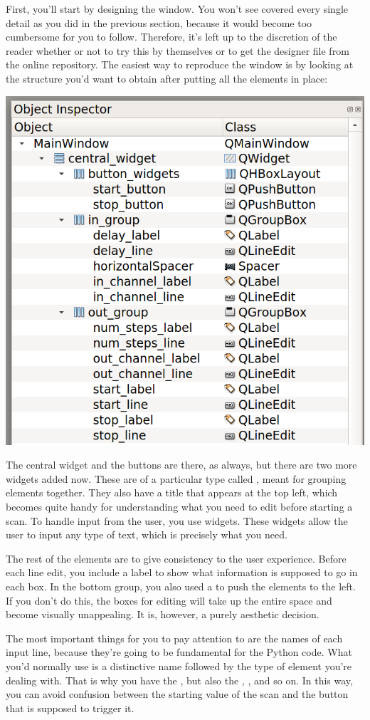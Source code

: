 First, you'll start by designing the window. You won't see covered every single detail as you did in the previous section, because it would become too cumbersome for you to follow. Therefore, it's left up to the discretion of the reader whether or not to try this by themselves or to get the designer file from the online repository. The easiest way to reproduce the window is by looking at the structure you'd want to obtain after putting all the elements in place:

\begin{center}
    \includegraphics[width=.5\textwidth]{images/Chapter_09/09_final_window_structure.png}
\end{center}

The central widget and the buttons are there, as always, but there are two more widgets added now. These are of a particular type called , meant for grouping elements together. They also have a title that appears at the top left, which becomes quite handy for understanding what you need to edit before starting a scan. To handle input from the user, you use  widgets. These widgets allow the user to input any type of text, which is precisely what you need.

The rest of the elements are to give consistency to the user experience. Before each line edit, you include a label to show what information is supposed to go in each box. In the bottom group, you also used a  to push the elements to the left. If you don't do this, the boxes for editing will take up the entire space and become visually unappealing. It is, however, a purely aesthetic decision.

The most important things for you to pay attention to are the names of each input line, because they're going to be fundamental for the Python code. What you'd normally use is a distinctive name followed by the type of element you're dealing with. That is why you have the , but also the , , and so on. In this way, you can avoid confusion between the starting value of the scan and the button that is supposed to trigger it.

